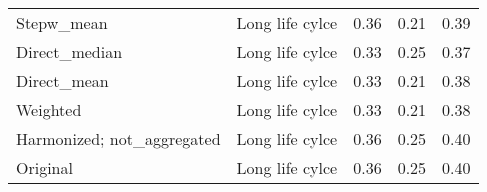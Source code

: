 \documentclass[../Draft_harmonization_paper.tex]{subfiles}
\begin{document}
\begin{table}[ht]
\begin{tabular}{llccc}
      Stepw\_mean & Long life cylce & 0.36 & 0.21 & 0.39 \\ 
      Direct\_median & Long life cylce & 0.33 & 0.25 & 0.37 \\ 
      Direct\_mean & Long life cylce & 0.33 & 0.21 & 0.38 \\ 
      Weighted & Long life cylce & 0.33 & 0.21 & 0.38 \\ 
      Harmonized; not\_aggregated & Long life cylce & 0.36 & 0.25 & 0.40 \\ 
      Original & Long life cylce & 0.36 & 0.25 & 0.40 \\ 
    \bottomrule
    \end{tabular}
\end{table}




\end{document}
